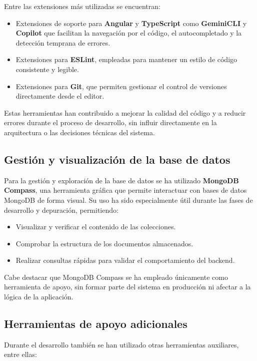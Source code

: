 Entre las extensiones más utilizadas se encuentran:
\begin{itemize}
    \item Extensiones de soporte para \textbf{Angular} y \textbf{TypeScript} como \textbf{GeminiCLI} y \textbf{Copilot} que facilitan la navegación por el código, el autocompletado y la detección temprana de errores.
    \item Extensiones para \textbf{ESLint}, empleadas para mantener un estilo de código consistente y legible.
    \item Extensiones para \textbf{Git}, que permiten gestionar el control de versiones directamente desde el editor.
\end{itemize}

Estas herramientas han contribuido a mejorar la calidad del código y a reducir errores durante el proceso de desarrollo, sin influir directamente en la arquitectura o las decisiones técnicas del sistema.

\subsection{Gestión y visualización de la base de datos}

Para la gestión y exploración de la base de datos se ha utilizado \textbf{MongoDB Compass}, una herramienta gráfica que permite interactuar con bases de datos MongoDB de forma visual. Su uso ha sido especialmente útil durante las fases de desarrollo y depuración, permitiendo:

\begin{itemize}
    \item Visualizar y verificar el contenido de las colecciones.
    \item Comprobar la estructura de los documentos almacenados.
    \item Realizar consultas rápidas para validar el comportamiento del backend.
\end{itemize}

Cabe destacar que MongoDB Compass se ha empleado únicamente como herramienta de apoyo, sin formar parte del sistema en producción ni afectar a la lógica de la aplicación.
\newpage
\subsection{Herramientas de apoyo adicionales}

Durante el desarrollo también se han utilizado otras herramientas auxiliares, entre ellas:

